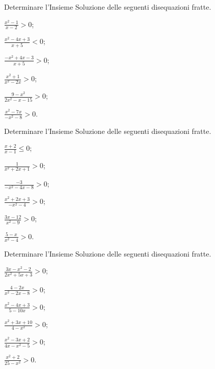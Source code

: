 \begin{esercizio}[\Ast]
 \label{ese:4.52}
Determinare l'Insieme Soluzione delle seguenti disequazioni fratte.
\begin{multicols}{3}
\begin{enumeratea}
\item $\frac{x^2-1}{x-2}>0$;
\item $\frac{x^2-4x+3}{x+5}<0$;
\item $\frac{-x^2+4x-3}{x+5}>0$;
\item $\frac{x^2+1}{x^2-2x}>0$;
\item $\frac{9-x^2}{2x^2-x-15}>0$;
\item $\frac{x^2-7x}{-x^2-8}>0$.
\end{enumeratea}
\end{multicols}
\end{esercizio}

\begin{esercizio}[\Ast]
 \label{ese:4.53}
Determinare l'Insieme Soluzione delle seguenti disequazioni fratte.
\begin{multicols}{3}
\begin{enumeratea}
\item $\frac{x+2}{x-1}\le 0$;
\item $\frac 1{x^2+2x+1}>0$;
\item $\frac{-3}{-x^2-4x-8}>0$;
\item $\frac{x^2+2x+3}{-x^2-4}>0$;
\item $\frac{3x-12}{x^2-9}>0$;
\item $\frac{5-x}{x^2-4}>0$.
\end{enumeratea}
\end{multicols}
\end{esercizio}

\begin{esercizio}[\Ast]
 \label{ese:4.54}
Determinare l'Insieme Soluzione delle seguenti disequazioni fratte.
\begin{multicols}{3}
\begin{enumeratea}
\item $\frac{3x-x^2-2}{2x^2+5x+3}>0$;
\item $\frac{4-2x}{x^2-2x-8}>0$;
\item $\frac{x^2-4x+3}{5-10x}>0$;
\item $\frac{x^2+3x+10}{4-x^2}>0$;
\item $\frac{x^2-3x+2}{4x-x^2-5}>0$;
\item $\frac{x^2+2}{25-x^2}>0$.
\end{enumeratea}
\end{multicols}
\end{esercizio}

